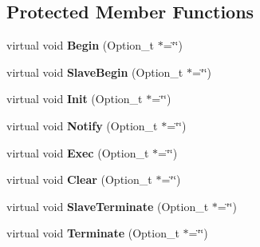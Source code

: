 \subsection*{Protected Member Functions}
\begin{DoxyCompactItemize}
\item 
\hypertarget{class_h_a_l_1_1_algorithm_a6273512af97092a7e50955cb69776d82}{virtual void {\bfseries Begin} (Option\-\_\-t $\ast$=\char`\"{}\char`\"{})}\label{class_h_a_l_1_1_algorithm_a6273512af97092a7e50955cb69776d82}

\item 
\hypertarget{class_h_a_l_1_1_algorithm_a468feb5807252729c62cce7db7d60b1d}{virtual void {\bfseries Slave\-Begin} (Option\-\_\-t $\ast$=\char`\"{}\char`\"{})}\label{class_h_a_l_1_1_algorithm_a468feb5807252729c62cce7db7d60b1d}

\item 
\hypertarget{class_h_a_l_1_1_algorithm_abe2da2ce6a2d3ccfb492d8afd1d07331}{virtual void {\bfseries Init} (Option\-\_\-t $\ast$=\char`\"{}\char`\"{})}\label{class_h_a_l_1_1_algorithm_abe2da2ce6a2d3ccfb492d8afd1d07331}

\item 
\hypertarget{class_h_a_l_1_1_algorithm_acbbfee57e6c71ab04047dca6636f2c4f}{virtual void {\bfseries Notify} (Option\-\_\-t $\ast$=\char`\"{}\char`\"{})}\label{class_h_a_l_1_1_algorithm_acbbfee57e6c71ab04047dca6636f2c4f}

\item 
\hypertarget{class_h_a_l_1_1_algorithm_a438c5c54698aa014b660474d08703bc2}{virtual void {\bfseries Exec} (Option\-\_\-t $\ast$=\char`\"{}\char`\"{})}\label{class_h_a_l_1_1_algorithm_a438c5c54698aa014b660474d08703bc2}

\item 
\hypertarget{class_h_a_l_1_1_algorithm_a2a26a5549e92efaa968763ac51e6758a}{virtual void {\bfseries Clear} (Option\-\_\-t $\ast$=\char`\"{}\char`\"{})}\label{class_h_a_l_1_1_algorithm_a2a26a5549e92efaa968763ac51e6758a}

\item 
\hypertarget{class_h_a_l_1_1_algorithm_a9735cc4d7ef34d440aff116c8dbf5cbb}{virtual void {\bfseries Slave\-Terminate} (Option\-\_\-t $\ast$=\char`\"{}\char`\"{})}\label{class_h_a_l_1_1_algorithm_a9735cc4d7ef34d440aff116c8dbf5cbb}

\item 
\hypertarget{class_h_a_l_1_1_algorithm_ab974f3b6336b7b1002c72c04ad2b59cb}{virtual void {\bfseries Terminate} (Option\-\_\-t $\ast$=\char`\"{}\char`\"{})}\label{class_h_a_l_1_1_algorithm_ab974f3b6336b7b1002c72c04ad2b59cb}

\end{DoxyCompactItemize}
